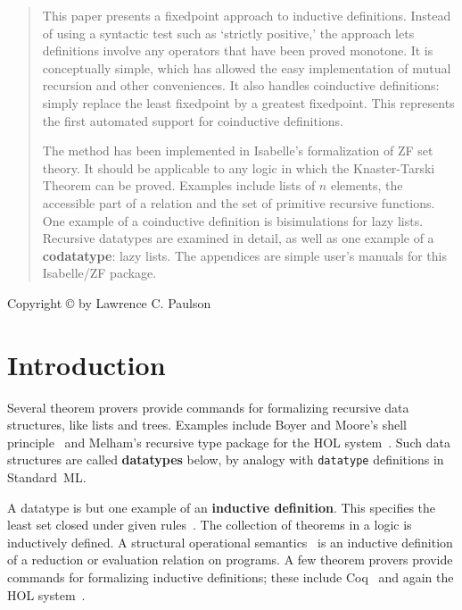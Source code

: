 \binperiod     %


\pagestyle{empty}
\begin{titlepage}
\maketitle 
\begin{abstract}
  This paper presents a fixedpoint approach to inductive definitions.
  Instead of using a syntactic test such as `strictly positive,' the
  approach lets definitions involve any operators that have been proved
  monotone.  It is conceptually simple, which has allowed the easy
  implementation of mutual recursion and other conveniences.  It also
  handles coinductive definitions: simply replace the least fixedpoint by a
  greatest fixedpoint.  This represents the first automated support for
  coinductive definitions.

  The method has been implemented in Isabelle's formalization of ZF set
  theory.  It should be applicable to any logic in which the Knaster-Tarski
  Theorem can be proved.  Examples include lists of $n$ elements, the
  accessible part of a relation and the set of primitive recursive
  functions.  One example of a coinductive definition is bisimulations for
  lazy lists.  \ifCADE\else Recursive datatypes are examined in detail, as
  well as one example of a {\bf codatatype}: lazy lists.  The appendices
  are simple user's manuals for this Isabelle/ZF package.\fi
\end{abstract}
%
\bigskip\centerline{Copyright \copyright{} \number\year{} by Lawrence C. Paulson}
\thispagestyle{empty} 
\end{titlepage}
\tableofcontents\cleardoublepage\pagestyle{plain}

\section{Introduction}
Several theorem provers provide commands for formalizing recursive data
structures, like lists and trees.  Examples include Boyer and Moore's shell
principle~\cite{bm79} and Melham's recursive type package for the HOL
system~\cite{melham89}.  Such data structures are called {\bf datatypes}
below, by analogy with {\tt datatype} definitions in Standard~ML\@.

A datatype is but one example of an {\bf inductive definition}.  This
specifies the least set closed under given rules~\cite{aczel77}.  The
collection of theorems in a logic is inductively defined.  A structural
operational semantics~\cite{hennessy90} is an inductive definition of a
reduction or evaluation relation on programs.  A few theorem provers
provide commands for formalizing inductive definitions; these include
Coq~\cite{paulin92} and again the HOL system~\cite{camilleri92}.

